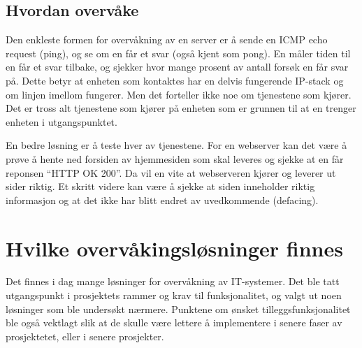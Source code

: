 \subsection{Hvordan overvåke}
Den enkleste formen for overvåkning av en server er å sende en ICMP echo request (ping), og se om en får et svar (også kjent som pong). En måler tiden til en får et svar tilbake, og sjekker hvor mange prosent av antall forsøk en får svar på. Dette betyr at enheten som kontaktes har en delvis fungerende IP-stack og om linjen imellom fungerer. Men det forteller ikke noe om tjenestene som kjører. Det er tross alt tjenestene som kjører på enheten som er grunnen til at en trenger enheten i utgangspunktet.

En bedre løsning er å teste hver av tjenestene. For en webserver kan det være å prøve å hente ned forsiden av hjemmesiden som skal leveres og sjekke at en får reponsen ``HTTP OK 200''. Da vil en vite at webserveren kjører og leverer ut sider riktig. Et skritt videre kan være å sjekke at siden inneholder riktig informasjon og at det ikke har blitt endret av uvedkommende (defacing).

\clearpage
\section{Hvilke overvåkingsløsninger finnes}\label{sec:hvilkefinnes}
Det finnes i dag mange løsninger for overvåkning av IT-systemer\cite{wiki:networkmonitoring}. Det ble tatt utgangspunkt i prosjektets rammer og krav til funksjonalitet, og valgt ut noen løsninger som ble undersøkt nærmere. Punktene om ønsket tilleggsfunksjonalitet ble også vektlagt slik at de skulle være lettere å implementere i senere faser av prosjektetet, eller i senere prosjekter. 

